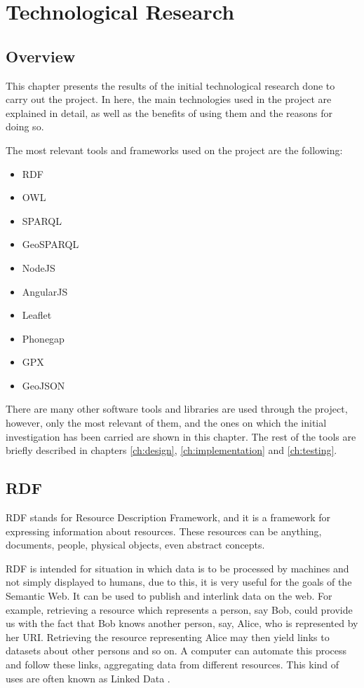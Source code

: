 \chapter{Technological Research}\label{cha:research}

\section{Overview}

This chapter presents the results of the initial technological research done to carry out the project. In here, the main technologies used in the project are explained in detail, as well as the benefits of using them and the reasons for doing so.

The most relevant tools and frameworks used on the project are the following:

\begin{itemize}
	\item RDF
	\item OWL
	\item SPARQL
	\item GeoSPARQL
	\item NodeJS
	\item AngularJS
	\item Leaflet
	\item Phonegap
	\item GPX
	\item GeoJSON
\end{itemize}

There are many other software tools and libraries are used through the project, however, only the most relevant of them, and the ones on which the initial investigation has been carried are shown in this chapter. The rest of the tools are briefly described in chapters \ref{ch:design}, \ref{ch:implementation} and \ref{ch:testing}.

\section{RDF}\label{sec:rdf}

RDF stands for Resource Description Framework, and it is a framework for expressing information about resources. These resources can be anything, documents, people, physical objects, even abstract concepts.

RDF is intended for situation in which data is to be processed by machines and not simply displayed to humans, due to this, it is very useful for the goals of the Semantic Web. It can be used to publish and interlink data on the web. For example, retrieving a resource which represents a person, say Bob, could provide us with the fact that Bob knows another person, say, Alice, who is represented by her URI. Retrieving the resource representing Alice may then yield links to datasets about other persons and so on. A computer can automate this process and follow these links, aggregating data from different resources. This kind of uses are often known as Linked Data \cite{rdfprimer11}. 

